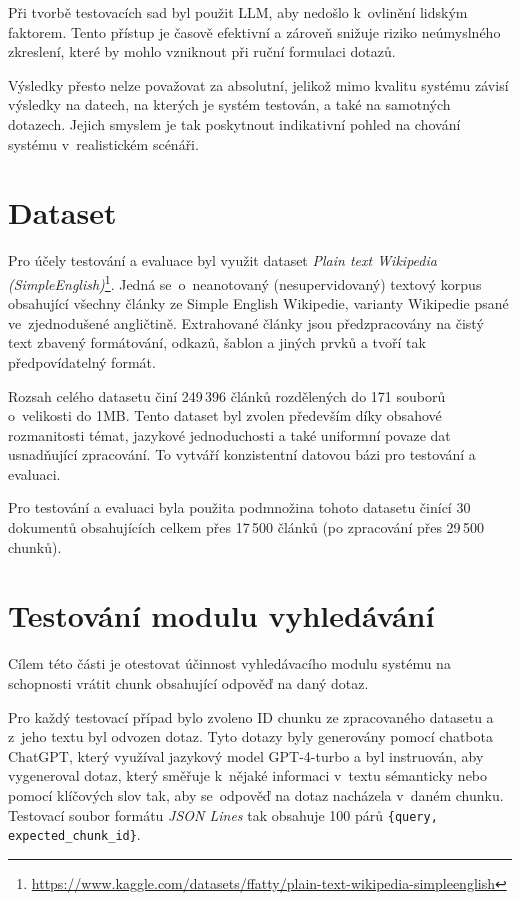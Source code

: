 Při tvorbě testovacích sad byl použit LLM, aby nedošlo k~ovlinění lidským faktorem. Tento přístup je časově efektivní a zároveň snižuje riziko neúmyslného zkreslení, které by mohlo vzniknout při ruční formulaci dotazů. 

Výsledky přesto nelze považovat za absolutní, jelikož mimo kvalitu systému závisí výsledky na datech, na kterých je systém testován, a také na samotných dotazech. Jejich smyslem je tak poskytnout indikativní pohled na chování systému v~realistickém scénáři.

\section{Dataset}
\label{dataset}
Pro účely testování a evaluace byl využit dataset \textit{Plain text Wikipedia (SimpleEnglish)}\footnote{\url{https://www.kaggle.com/datasets/ffatty/plain-text-wikipedia-simpleenglish}}. Jedná se~o~neanotovaný (nesupervidovaný) textový korpus obsahující všechny články ze Simple English Wikipedie, varianty Wikipedie psané ve~zjednodušené angličtině. Extrahované články jsou předzpracovány na čistý text zbavený formátování, odkazů, šablon a jiných prvků a tvoří tak předpovídatelný formát.

Rozsah celého datasetu činí 249\,396 článků rozdělených do 171 souborů o~velikosti do 1MB. Tento dataset byl zvolen především díky obsahové rozmanitosti témat, jazykové jednoduchosti a také uniformní povaze dat usnadňující zpracování. To vytváří konzistentní datovou bázi pro testování a evaluaci.

Pro testování a evaluaci byla použita podmnožina tohoto datasetu činící 30 dokumentů obsahujících celkem přes 17\,500 článků (po zpracování přes 29\,500 chunků).

\section{Testování modulu vyhledávání}
Cílem této části je otestovat účinnost vyhledávacího modulu systému na schopnosti vrátit chunk obsahující odpověď na daný dotaz.

Pro každý testovací případ bylo zvoleno ID chunku ze zpracovaného datasetu a z~jeho textu byl odvozen dotaz. Tyto dotazy byly generovány pomocí chatbota ChatGPT, který využíval jazykový model GPT-4-turbo a byl instruován, aby vygeneroval dotaz, který směřuje k~nějaké informaci v~textu sémanticky nebo pomocí klíčových slov tak, aby se~odpověď na dotaz nacházela v~daném chunku. Testovací soubor formátu \textit{JSON Lines} tak obsahuje 100 párů \texttt{\{query, expected\_chunk\_id\}}.

